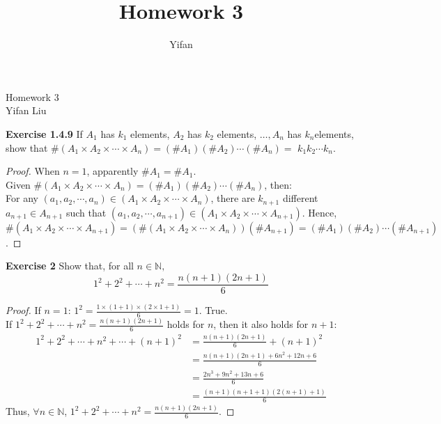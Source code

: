 \documentclass[12pt]{article}
\title{Homework 3}
\author{Yifan}
\newcommand{\bbN}{\mathbb{N}}
\theoremstyle{definition}
\numberwithin{equation}{subsection}
\begin{document}
\pagestyle{plain}



\begin{center}
{\large Homework 3} \\
\vspace{.2in}
Yifan Liu
\end{center}

\bigskip \bigskip


\textbf{Exercise 1.4.9} If \(A_{1}\) has \(k_{1}\) elements, \(A_{2}\) has \(k_{2}\) elements, \(\ldots, A_{n}\) has \(k_{n}\)elements, show that \(\#\left(A_{1} \times A_{2} \times \cdots \times A_{n}\right)=\left(\# A_{1}\right)\left(\# A_{2}\right) \cdots\left(\# A_{n}\right)=\) \(k_{1} k_{2} \cdots k_{n} .\)
\begin{proof}
When $n=1$, apparently $\#A_{1}=\#A_1$.\\
Given \(\#\left(A_{1} \times A_{2} \times \cdots \times A_{n}\right)=\left(\# A_{1}\right)\left(\# A_{2}\right) \cdots\left(\# A_{n}\right)\), then:\\
For any $(a_1,a_2,\cdots,a_n) \in (A_{1} \times A_{2} \times \cdots \times A_{n})$, there are $k_{n+1}$ different $a_{n+1} \in A_{n+1}$ such that $(a_1,a_2,\cdots,a_{n+1}) \in (A_{1} \times A_{2} \times \cdots \times A_{n+1})$. Hence, \(\#\left(A_{1} \times A_{2} \times \cdots \times A_{n+1}\right)
=\left(\#\left(A_{1} \times A_{2} \times \cdots \times A_{n}\right)\right)\left(\#A_{n+1}\right)
=\left(\# A_{1}\right)\left(\# A_{2}\right) \cdots\left(\# A_{n+1}\right)\).
\end{proof}

\textbf{Exercise 2} Show that, for all \(n \in \mathbb{N},\)
$$
1^{2}+2^{2}+\cdots+n^{2}=\frac{n(n+1)(2 n+1)}{6}
$$
\begin{proof}
If $n = 1$:
$1^{2}=\frac{1\times(1+1)\times(2\times 1+1)}{6}=1$. True.\\
If $1^{2}+2^{2}+\cdots+n^{2}=\frac{n(n+1)(2 n+1)}{6}$ holds for $n$, then it also holds for $n + 1$:\\
\begin{align*}
1^{2}+2^{2}+\cdots+n^{2}+\cdots+(n+1)^{2}&=\frac{n(n+1)(2 n+1)}{6}+(n+1)^{2}\\
&=\frac{n(n+1)(2 n+1)+6n^{2}+12n+6}{6}\\
&=\frac{2 n^{3}+9 n^{2}+13 n+6}{6}\\
&=\frac{(n+1)(n+1+1)(2(n+1)+1)}{6}
\end{align*}
Thus, $\forall n \in \bbN$, $1^{2}+2^{2}+\cdots+n^{2}=\frac{n(n+1)(2 n+1)}{6}$.

\end{proof}
\end{document}
